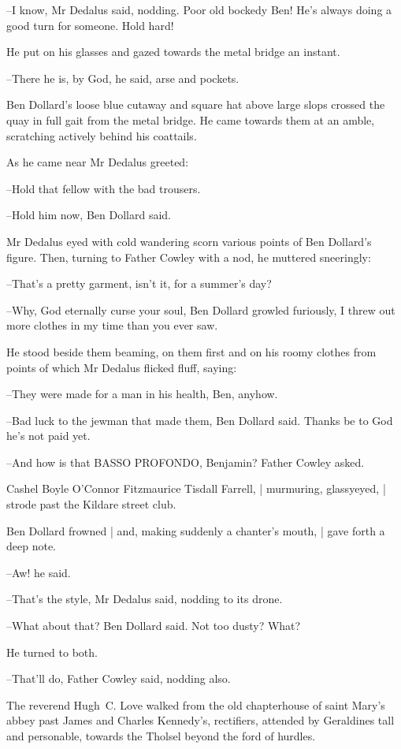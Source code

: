 --I know, Mr Dedalus said, nodding. Poor old bockedy Ben! He's always
doing a good turn for someone. Hold hard!

He put on his glasses and gazed towards the metal bridge an instant.

--There he is, by God, he said,
arse and pockets.

Ben Dollard's loose blue cutaway and square hat above large slops crossed
the quay in full gait from the metal bridge. He came towards them at an
amble, scratching actively behind his coattails.

As he came near Mr Dedalus greeted:

--Hold that fellow with the bad trousers.

--Hold him now, Ben Dollard said.

Mr Dedalus eyed with cold wandering scorn various points of Ben Dollard's
figure. Then, turning to Father Cowley with a nod, he muttered
sneeringly:

--That's a pretty garment, isn't it,
for a summer's day?

--Why, God eternally curse your soul, Ben Dollard growled furiously, I
threw out more clothes in my time than you ever saw.

He stood beside them beaming, on them first and on his roomy clothes from
points of which Mr Dedalus flicked fluff, saying:

--They were made for a man in his health, Ben, anyhow.

--Bad luck to the jewman that made them, Ben Dollard said. Thanks be to
God he's not paid yet.

--And how is that BASSO PROFONDO, Benjamin? Father Cowley asked.

Cashel Boyle O'Connor Fitzmaurice Tisdall Farrell, |
murmuring, glassyeyed, |
strode past the Kildare street club.

Ben Dollard frowned |
and, making suddenly a chanter's mouth, |
gave forth a deep note.

--Aw! he said.

--That's the style, Mr Dedalus said, nodding to its drone.

--What about that? Ben Dollard said. Not too dusty? What?

He turned to both.

--That'll do, Father Cowley said, nodding also.

The reverend Hugh~C. Love
walked from the old chapterhouse of saint Mary's abbey
past James and Charles Kennedy's, rectifiers,
attended by Geraldines tall and personable,
towards the Tholsel beyond the ford of hurdles.

